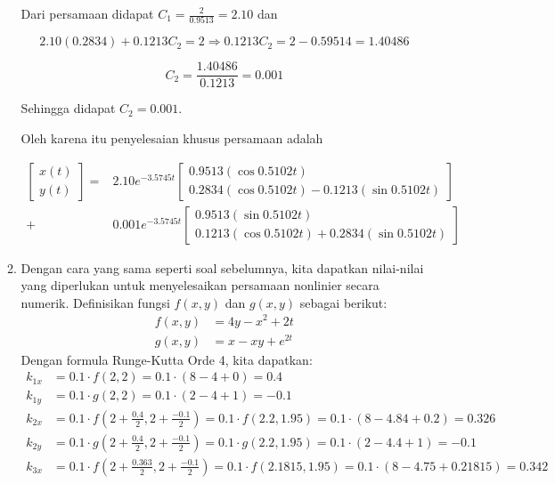 \documentclass{article}
\begin{document}
\begin{enumerate}
\begin{enumerate}[label=\alph*.]
Dari persamaan didapat \( C_1 = \frac{2}{0.9513} = 2.10 \) dan

\[
2.10 (0.2834) + 0.1213 C_2 = 2 \Rightarrow 0.1213 C_2 = 2 - 0.59514 = 1.40486
\]

\[
C_2 = \frac{1.40486}{0.1213} = 0.001
\]

Sehingga didapat \( C_2 = 0.001 \).

Oleh karena itu penyelesaian khusus persamaan adalah

\begin{align*}
\begin{bmatrix} x(t) \\ y(t) \end{bmatrix} =& 2.10e^{-3.5745t}\begin{bmatrix} 0.9513 (\cos 0.5102t) \\ 0.2834 (\cos 0.5102t) - 0.1213 (\sin 0.5102t) \end{bmatrix} \\+ 
&0.001e^{-3.5745t} \begin{bmatrix} 0.9513 (\sin 0.5102t) \\ 0.1213 (\cos 0.5102t) + 0.2834 (\sin 0.5102t) \end{bmatrix} 
\end{align*}
            \item Dengan cara yang sama seperti soal sebelumnya, kita dapatkan nilai-nilai yang diperlukan untuk menyelesaikan persamaan nonlinier secara numerik. Definisikan fungsi \( f(x,y) \) dan \( g(x,y) \) sebagai berikut:
            \begin{align*}
                f(x,y) &= 4y - x^2 + 2t\\
                g(x,y) &= x - xy + e^{2t}
            \end{align*}
            Dengan formula Runge-Kutta Orde 4, kita dapatkan:
            \begin{align*}
                k_{1x} &= 0.1 \cdot f(2,2) = 0.1 \cdot (8-4+0) = 0.4\\
                k_{1y} &= 0.1 \cdot g(2,2) = 0.1 \cdot (2-4+1) = -0.1\\
                k_{2x} &= 0.1 \cdot f\left(2 + \frac{0.4}{2}, 2 + \frac{-0.1}{2}\right) = 0.1 \cdot f(2.2,1.95) = 0.1 \cdot (8-4.84+0.2) = 0.326\\
                k_{2y} &= 0.1 \cdot g\left(2 + \frac{0.4}{2}, 2 + \frac{-0.1}{2}\right) = 0.1 \cdot g(2.2,1.95) = 0.1 \cdot (2-4.4+1) = -0.1\\
                k_{3x} &= 0.1 \cdot f\left(2 + \frac{0.363}{2}, 2 + \frac{-0.1}{2}\right) = 0.1 \cdot f(2.1815,1.95) = 0.1 \cdot (8-4.75+0.21815) = 0.342\\

\end{align*}
\end{enumerate}
\end{enumerate}
\end{document}
